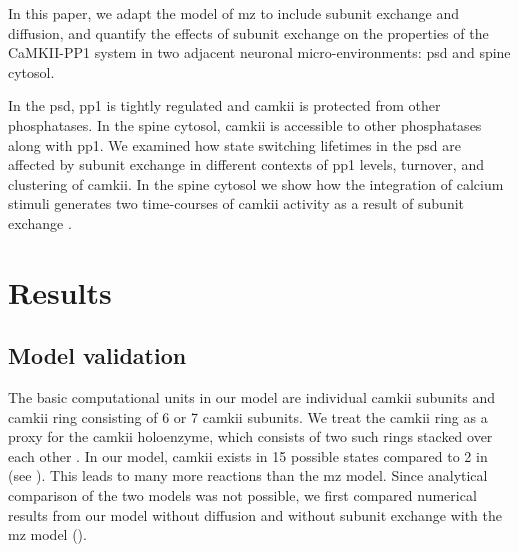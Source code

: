 \documentclass[9pt,lineno,doublespacing]{elife}
\begin{document}
In this paper, we adapt the model of \gls{mz} \citep{miller_stability_2005} to
include subunit exchange and diffusion, and quantify the effects of subunit
exchange on the properties of the CaMKII-PP1 system in two adjacent neuronal
micro-environments: \gls{psd} and spine cytosol. 

In the \gls{psd}, \gls{pp1} is tightly regulated and \gls{camkii} is protected
from other phosphatases. In the spine cytosol, \gls{camkii} is accessible to other
phosphatases along with \gls{pp1}. We examined how state switching lifetimes in
the \gls{psd} are affected by subunit exchange in different contexts of
\gls{pp1} levels, turnover, and clustering of \gls{camkii}. In the spine cytosol
we show how the integration of calcium stimuli generates two time-courses of
\gls{camkii} activity as a result of subunit exchange \citep{chang_camkii_2017}.

\section{Results}\label{sec:results} 
\subsection{Model validation}\label{subsec:model-validation}

The basic computational units in our model are individual \gls{camkii} subunits
and \gls{camkii} ring consisting of 6 or 7 \gls{camkii} subunits. We treat the
\gls{camkii} ring as a proxy for the \gls{camkii} holoenzyme, which consists of
two such rings stacked over each other
\citep{woodgett_calmodulin-dependent,hoelz_crystal_2003}. In our model,
\gls{camkii} exists in 15 possible states compared to 2 in
\citep{miller_stability_2005} (see ). This
leads to many more reactions than the \gls{mz} model. Since analytical
comparison of the two models was not possible, we first compared numerical
results from our model without diffusion and without subunit exchange with the
\gls{mz} model ().
\end{document}
